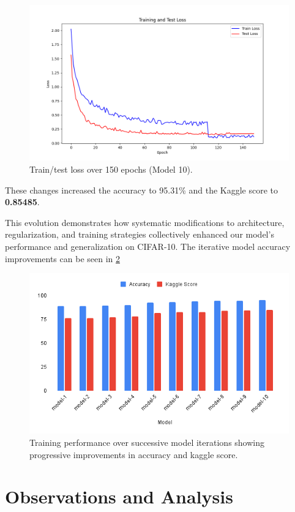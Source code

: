 \documentclass[letterpaper]{article}
\begin{document}
\begin{enumerate}
    \begin{figure}[h]
    \centering
        \includegraphics[width=0.9\linewidth]{images/train_test_loss_95.31.png}
    \caption{Train/test loss over 150 epochs (Model 10).}
    \label{fig:training_performance}
    \end{figure}
\end{enumerate}

These changes increased the accuracy to 95.31\% and the Kaggle score to \textbf{0.85485}.

This evolution demonstrates how systematic modifications to architecture, regularization, and training strategies collectively enhanced our model's performance and generalization on CIFAR-10. The iterative model accuracy improvements can be seen in \ref{fig:all_iterations}

\begin{figure}[ht]
\centering
\includegraphics[width=0.8\linewidth]{images/accuracy_charts.png}
\caption{Training performance over successive model iterations showing progressive improvements in accuracy and kaggle score.}
\label{fig:all_iterations}
\end{figure}

\section{Observations and Analysis}
\end{document}
